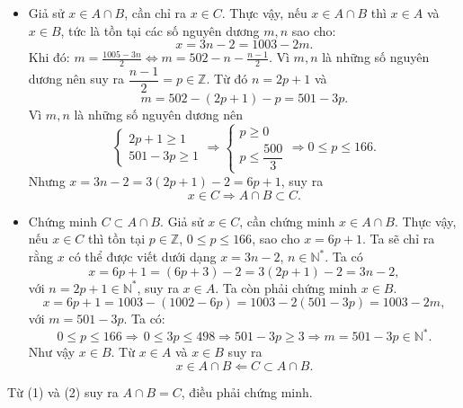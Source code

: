\begin{itemize}
	\item Giả sử $x \in A \cap B$, cần chỉ ra $x\in C$. Thực vậy, nếu 
	$x \in A \cap B$ thì $x\in A$ và $x\in B$, tức là tồn tại các số nguyên dương $m, n$ sao cho:
	$$x = 3n - 2 = 1003 - 2m.$$
	Khi đó:  $\displaystyle m = \frac{1005 - 3n}{2} \Leftrightarrow m = 502 - n - \frac{n - 1}{2}$. Vì $m, n$ là những số nguyên
	dương nên suy ra $\dfrac{n - 1}{2} = p \in \mathbb{Z}$. Từ đó $n = 2p + 1$ và
	$$m = 502 - (2p + 1) - p = 501 - 3p.$$
	Vì $m, n$ là những số nguyên dương nên
	$$\left\{ \begin{array}{l}
	2p + 1 \ge 1\\
	501 - 3p \ge 1
	\end{array} \right. \Rightarrow \left\{ \begin{array}{l}
	p \ge 0\\
	p \le \dfrac{{500}}{3}
	\end{array} \right. \Rightarrow 0 \le p \le 166.$$
	Nhưng $x = 3n - 2 = 3(2p + 1) - 2 = 6p + 1$, suy ra 
	\[x \in C \Rightarrow A \cap B \subset C.\tag{1}\]
	\item Chứng minh $C \subset A \cap B$. Giả sử $x\in C$, cần chứng minh $x \in A \cap B$. Thực vậy, nếu $x\in C$ thì tồn tại $p\in\mathbb{Z}$, 
	$0 \le p \le 166$, sao cho $x=6p+1$. Ta sẽ chỉ ra rằng $x$ có thể được viết dưới dạng $x=3n-2$, $n\in\mathbb{N}^*$.
	Ta có 
	$$x = 6p + 1 = (6p + 3) - 2 = 3(2p + 1) - 2 = 3n - 2,$$
	với $n=2p+1\in \mathbb{N}^*$, suy ra $x\in A$. Ta còn phải chứng minh $x\in B$.
	$$x = 6p + 1 = 1003 - (1002 - 6p) = 1003 - 2(501 - 3p) = 1003 - 2m,$$
	với $m = 501 - 3p$. Ta có: 
	$$0 \le p \le 166 \Rightarrow \,0 \le 3p \le 498 \Rightarrow 501 - 3p \ge 3 \Rightarrow m = 501 - 3p \in \mathbb{N}^*.$$
	Như vậy $x\in B$. Từ $x\in A$ và $x\in B$ suy ra 
	\[x \in A \cap B\Leftarrow C \subset A \cap B.\tag{2}\]
\end{itemize}
Từ (1) và (2) suy ra $A \cap B = C$, điều phải chứng minh.

